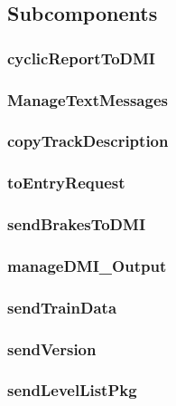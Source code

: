 \subsection{Subcomponents}\label{s:ManageDMIOutput_subcomponents}


\subsubsection{cyclicReportToDMI}


\subsubsection{ManageTextMessages}


\subsubsection{copyTrackDescription}


\subsubsection{toEntryRequest}


\subsubsection{sendBrakesToDMI}


\subsubsection{manageDMI\_Output}


\subsubsection{sendTrainData}


\subsubsection{sendVersion}


\subsubsection{sendLevelListPkg}









